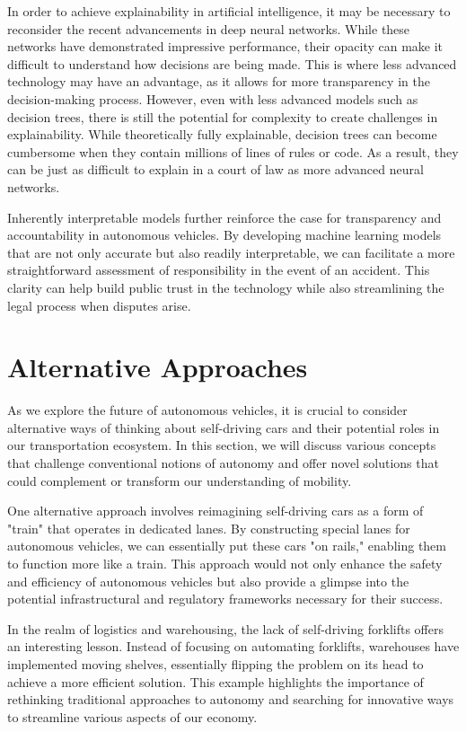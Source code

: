 \begin{pdf}
\begin{pdf}
In order to achieve explainability in artificial intelligence, it may be necessary to reconsider the recent advancements in deep neural networks. While these networks have demonstrated impressive performance, their opacity can make it difficult to understand how decisions are being made. This is where less advanced technology may have an advantage, as it allows for more transparency in the decision-making process. However, even with less advanced models such as decision trees, there is still the potential for complexity to create challenges in explainability. While theoretically fully explainable, decision trees can become cumbersome when they contain millions of lines of rules or code. As a result, they can be just as difficult to explain in a court of law as more advanced neural networks.

Inherently interpretable models further reinforce the case for transparency and accountability in autonomous vehicles. By developing machine learning models that are not only accurate but also readily interpretable, we can facilitate a more straightforward assessment of responsibility in the event of an accident. This clarity can help build public trust in the technology while also streamlining the legal process when disputes arise.

\section{Alternative Approaches}

As we explore the future of autonomous vehicles, it is crucial to consider alternative ways of thinking about self-driving cars and their potential roles in our transportation ecosystem. In this section, we will discuss various concepts that challenge conventional notions of autonomy and offer novel solutions that could complement or transform our understanding of mobility.

One alternative approach involves reimagining self-driving cars as a form of "train" that operates in dedicated lanes. By constructing special lanes for autonomous vehicles, we can essentially put these cars "on rails," enabling them to function more like a train. This approach would not only enhance the safety and efficiency of autonomous vehicles but also provide a glimpse into the potential infrastructural and regulatory frameworks necessary for their success.

In the realm of logistics and warehousing, the lack of self-driving forklifts offers an interesting lesson. Instead of focusing on automating forklifts, warehouses have implemented moving shelves, essentially flipping the problem on its head to achieve a more efficient solution. This example highlights the importance of rethinking traditional approaches to autonomy and searching for innovative ways to streamline various aspects of our economy.


\end{pdf}
\end{pdf}
